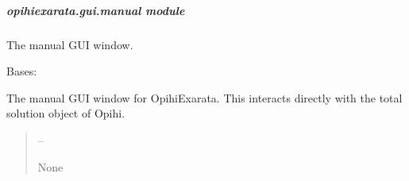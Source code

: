 \documentclass[letterpaper,11pt,english]{sphinxmanual}
\begin{document}
\sphinxstepscope


\subparagraph{opihiexarata.gui.manual module}
\label{\detokenize{code/opihiexarata.gui.manual:module-opihiexarata.gui.manual}}\label{\detokenize{code/opihiexarata.gui.manual:opihiexarata-gui-manual-module}}\label{\detokenize{code/opihiexarata.gui.manual::doc}}
\sphinxAtStartPar
The manual GUI window.

\begin{savenotes}\begin{fulllineitems}
\label{\detokenize{code/opihiexarata.gui.manual:opihiexarata.gui.manual.OpihiManualWindow}}
\pysigstartsignatures
{}
\pysigstopsignatures
\sphinxAtStartPar
Bases: 

\begin{savenotes}\begin{fulllineitems}
\label{\detokenize{code/opihiexarata.gui.manual:opihiexarata.gui.manual.OpihiManualWindow.__init__}}
\pysigstartsignatures
{}
\pysigstopsignatures
\sphinxAtStartPar
The manual GUI window for OpihiExarata. This interacts directly
with the total solution object of Opihi.
\begin{quote}\begin{description}
\sphinxAtStartPar
{} – 

\sphinxAtStartPar
None

\end{description}\end{quote}

\end{fulllineitems}\end{savenotes}



\end{fulllineitems}
\end{savenotes}
\end{document}
